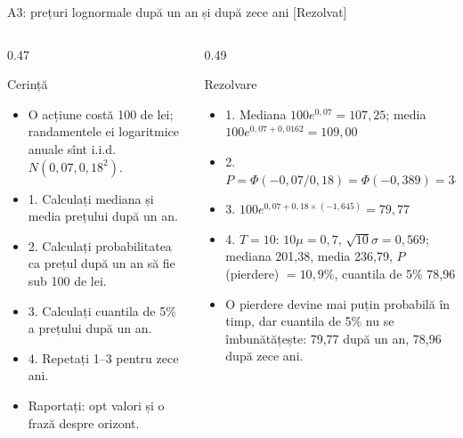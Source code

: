 \begin{frame}{A3: prețuri lognormale după un an și după zece ani [Rezolvat]}
\itemsize{\scriptsize}
\begin{columns}[T]
\begin{column}{0.47\textwidth}
\begin{block}{Cerință}
\begin{itemize}
    \item O acțiune costă 100 de lei; randamentele ei logaritmice anuale sînt i.i.d. $N(0{,}07, 0{,}18^2)$.
    \item 1. Calculați mediana și media prețului după un an.
    \item 2. Calculați probabilitatea ca prețul după un an să fie sub 100 de lei.
    \item 3. Calculați cuantila de 5\% a prețului după un an.
    \item 4. Repetați 1--3 pentru zece ani.
    \item Raportați: opt valori și o frază despre orizont.
\end{itemize}
\end{block}
\end{column}
\begin{column}{0.49\textwidth}
\begin{exampleblock}{Rezolvare}
\begin{itemize}
    \item 1. Mediana $100e^{0{,}07} = 107{,}25$; media $100e^{0{,}07 + 0{,}0162} = 109{,}00$
    \item 2. $P = \Phi(-0{,}07/0{,}18) = \Phi(-0{,}389) = 34{,}9\%$
    \item 3. $100e^{0{,}07 + 0{,}18 \times (-1{,}645)} = 79{,}77$
    \item 4. $T = 10$: $10\mu = 0{,}7$, $\sqrt{10}\sigma = 0{,}569$; mediana 201{,}38, media 236{,}79, $P$(pierdere) $= 10{,}9\%$, cuantila de 5\% 78{,}96
    \item O pierdere devine mai puțin probabilă în timp, dar cuantila de 5\% nu se îmbunătățește: 79{,}77 după un an, 78{,}96 după zece ani.
\end{itemize}
\end{exampleblock}
\end{column}
\end{columns}
\end{frame}

